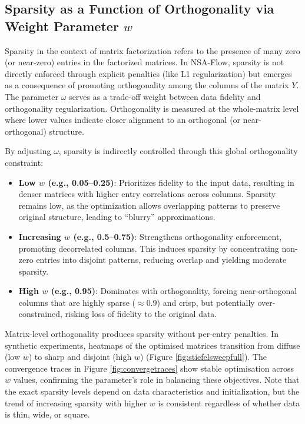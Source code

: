 \documentclass[
]{article}
\begin{document}
\subsection{\texorpdfstring{Sparsity as a Function of Orthogonality via Weight Parameter \(w\)}{Sparsity as a Function of Orthogonality via Weight Parameter w}}\label{sparsity}

Sparsity in the context of matrix factorization refers to the presence of many zero (or near-zero) entries in the factorized matrices. In NSA-Flow, sparsity is not directly enforced through explicit penalties (like L1 regularization) but emerges as a consequence of promoting orthogonality among the columns of the matrix \(Y\). The parameter \(\omega\) serves as a trade-off weight between data fidelity and orthogonality regularization. Orthogonality is measured at the whole-matrix level where lower values indicate closer alignment to an orthogonal (or near-orthogonal) structure.

By adjusting \(\omega\), sparsity is indirectly controlled through this global orthogonality constraint:

\begin{itemize}
\item
  \textbf{Low \(w\) (e.g., 0.05--0.25)}: Prioritizes fidelity to the input data, resulting in denser matrices with higher entry correlations across columns. Sparsity remains low, as the optimization allows overlapping patterns to preserve original structure, leading to ``blurry'' approximations.
\item
  \textbf{Increasing \(w\) (e.g., 0.5--0.75)}: Strengthens orthogonality enforcement, promoting decorrelated columns. This induces sparsity by concentrating non-zero entries into disjoint patterns, reducing overlap and yielding moderate sparsity.
\item
  \textbf{High \(w\) (e.g., 0.95)}: Dominates with orthogonality, forcing near-orthogonal columns that are highly sparse (\(\approx 0.9\)) and crisp, but potentially over-constrained, risking loss of fidelity to the original data.
\end{itemize}

Matrix-level orthogonality produces sparsity without per-entry penalties. In synthetic experiments, heatmaps of the optimised matrices transition from diffuse (low \(w\)) to sharp and disjoint (high \(w\)) (Figure \ref{fig:stiefelsweepfull}). The convergence traces in Figure \ref{fig:convergetraces} show stable optimisation across \(w\) values, confirming the parameter's role in balancing these objectives. Note that the exact sparsity levels depend on data characteristics and initialization, but the trend of increasing sparsity with higher \(w\) is consistent regardless of whether data is thin, wide, or square.
\end{document}
